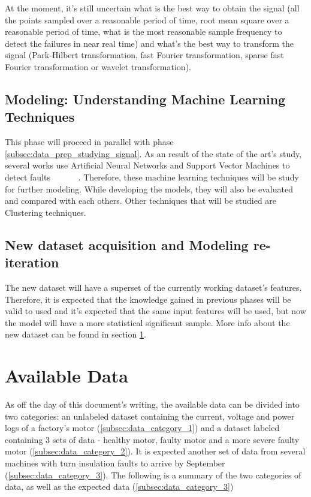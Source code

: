At the moment, it's still uncertain what is the best way to obtain the signal (all the points sampled over a reasonable period of time, root mean square over a reasonable period of time, what is the most reasonable sample frequency to detect the failures in near real time) and what's the best way to transform the signal (Park-Hilbert transformation, fast Fourier transformation, sparse fast Fourier transformation or wavelet transformation).


\subsection{Modeling: Understanding Machine Learning Techniques}
\label{subsec:modeling_under_machine_learning}

This phase will proceed in parallel with phase \ref{subsec:data_prep_studying_signal}. As an result of the state of the art's study, several works use Artificial Neural Networks and Support Vector Machines to detect faults ~\cite{Toma2011} ~\cite{Wolkiewicz2013} ~\cite{Patel2016} ~\cite{Jagadanand2015}. Therefore, these machine learning techniques will be study for further modeling. While developing the models, they will also be evaluated and compared with each others.  
Other techniques that will be studied are Clustering techniques.

\subsection{New dataset acquisition and Modeling re-iteration}
\label{subsec:reiteration}

The new dataset will have a superset of the currently working dataset's features. Therefore, it is expected that the knowledge gained in previous phases will be valid to used and it's expected that the same input features will be used, but now the model will have a more statistical significant sample. More info about the new dataset can be found in section \ref{sec:available_data}.


\section{Available Data}
\label{sec:available_data}

As off the day of this document's writing, the available data can be divided into two categories: an unlabeled dataset containing the current, voltage and power logs of a factory's motor (\ref{subsec:data_category_1}) and a dataset labeled containing 3 sets of data - healthy motor, faulty motor and a more severe faulty motor (\ref{subsec:data_category_2}).
It is expected another set of data from several machines with turn insulation faults to arrive by September (\ref{subsec:data_category_3}).
The following is a summary of the two categories of data, as well as the expected data (\ref{subsec:data_category_3})


